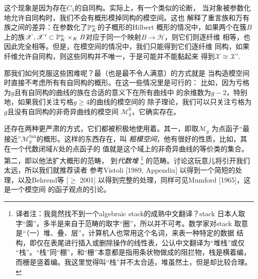这个现象是因为存在$C_\lambda$的自同构。实际上，有一个类似的论断，
当对象被参数化地允许自同构时，我们不会有概形模掉同构的模空间。这也
解释了重言族和万有族之间的差异：在参数化了$\P_K^n$的子概形的Hilbert
概形的情况中，如果两个在簇$B$上的族$\mathscr X,\mathscr X'\subset 
\P_K^n\times_K B$对应于同一个映射$B\to \mathscr H$，则它们则逐纤维
相等，也因此完全相等。但是，在模空间的情况中，我们只能得到它们逐纤维
同构，如果纤维允许自同构，则这些同构并不唯一，于是可能并不能黏起来
得到$\mathscr X\cong \mathscr X'$.

那我们如何克服这些困难呢？最\naive（也是最不令人满意）的方式就是
当构造模空间时直接不考虑所有有自同构的概形。在这一些情况里是可行的：
比如，因为亏格为$g$且有自同构的曲线的族在合适的意义下在所有曲线中
的余维数为$g-2$，特别地，如果我们关注亏格$g\geq 4$的曲线的模空间的
除子理论，我们可以只关注亏格为$g$且没有自同构的非奇异曲线的模空间
$\mathscr M_g^0$，它确实存在。

还存在两种更严肃的方式，它们都被积极地使用着。其一，即取$\mathscr M_g$
为点函子“最接近”$\mathscr M_g^{\text{fun}}$的概形。这样的东西存在，叫%
\emph{粗模空间}，他有很好的性质，比如，其在一个代数闭域$K$处的点函子的
值就是这个域上的非奇异曲线的等价类的集合。第二，即以他法扩大概形的范畴，
到\emph{代数堆}%
\footnote{译者注：我竟然找不到一个algebraic stack的成熟中文翻译？stack
日本人取字“園”，多半是来自于范畴的取字“圈”，所以并不可考。数学家对stack
取意是“（一）堆、叠、层”，计算机人也常用这个名词，来表一种特定的数据
结构，即仅在表尾进行插入或删除操作的线性表，公认中文翻译为“堆栈”或仅
“栈”。“栈”同“棚”，和“栅”本意都是指用条状物做成的阻拦物，栈是横着编，
而栅是竖着编。我这里觉得叫“栈”并不太合适，堆虽然土，但是却比较合理。
}%
的范畴。讨论这玩意儿将引开我们太远，所以我们就推荐读者%
参考Vistoli [1989, Appendix] 以得到一个简短的处理，以及Behrend等
[$\geq$ 2001] 以得到完整的处理，同样可见Mumford [1965]，这是一个模空间
的函子观点的引论。